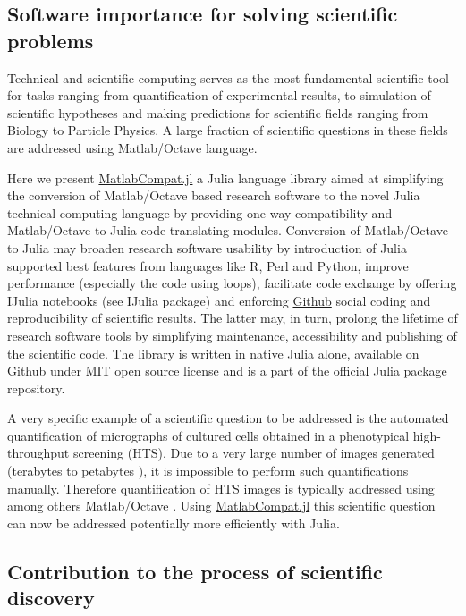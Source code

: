 \subsection{Software importance for solving scientific problems}

Technical and scientific computing serves as the most fundamental scientific tool for tasks ranging from quantification of experimental results, to simulation of scientific hypotheses and making predictions for scientific fields ranging from Biology to Particle Physics. A large fraction of scientific questions in these fields are addressed using Matlab/Octave language.

Here we present \href{https://github.com/MatlabCompat/MatlabCompat.jl}{MatlabCompat.jl} a Julia language library aimed at simplifying the conversion of Matlab/Octave based research software to the novel Julia technical computing language by providing one-way compatibility and Matlab/Octave to Julia code translating modules. Conversion of Matlab/Octave to Julia may broaden research software usability by introduction of Julia supported best features from languages like R, Perl and Python, improve performance (especially the code using loops), facilitate code exchange by offering IJulia notebooks (see IJulia package) and enforcing \href{http://github.com}{Github} social coding and reproducibility of scientific results. The latter may, in turn, prolong the lifetime of research software tools by simplifying maintenance, accessibility and publishing of the scientific code. The library is written in native Julia alone, available on Github under MIT open source license and is a part of the official Julia package repository.

A very specific example of a scientific question to be addressed is the automated quantification of micrographs of cultured cells obtained in a phenotypical high-throughput screening (HTS). Due to a very large number of images generated (terabytes to petabytes \cite{R_m__2014}), it is impossible to perform such quantifications manually. Therefore quantification of HTS images is typically addressed using among others Matlab/Octave \cite{22787215, 17076895, R_m__2014}. Using \href{https://github.com/MatlabCompat/MatlabCompat.jl}{MatlabCompat.jl} this scientific question can now be addressed potentially more efficiently with Julia.

\subsection{Contribution to the process of scientific discovery}

